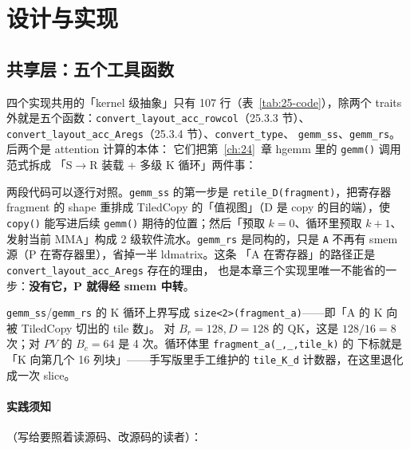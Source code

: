 \section{设计与实现}

\subsection{共享层：五个工具函数}

四个实现共用的「kernel 级抽象」只有 107 行（表~\ref{tab:25-code}），除两个
traits 外就是五个函数：\texttt{convert\_\allowbreak{}layout\_\allowbreak{}acc\_\allowbreak{}rowcol}（25.3.3 节）、
\texttt{convert\_\allowbreak{}layout\_\allowbreak{}acc\_\allowbreak{}Aregs}（25.3.4 节）、\texttt{convert\_\allowbreak{}type}、
\texttt{gemm\_ss}、\texttt{gemm\_rs}。后两个是 attention 计算的本体：
它们把第~\ref{ch:24}~章 hgemm 里的 \texttt{gemm()} 调用范式拆成
「S$\to$R 装载 + 多级 K 循环」两件事：





两段代码可以逐行对照。\texttt{gemm\_ss} 的第一步是
\texttt{retile\_\allowbreak{}D\allowbreak{}(fragment)}，把寄存器 fragment 的 shape 重排成 TiledCopy
的「值视图」（D 是 copy 的目的端），使 \texttt{copy()} 能写进后续
\texttt{gemm()} 期待的位置；然后「预取 $k{=}0$、循环里预取 $k{+}1$、
发射当前 MMA」构成 2 级软件流水。\texttt{gemm\_rs} 是同构的，只是
\texttt{A} 不再有 smem 源（P 在寄存器里），省掉一半 ldmatrix。这条
「A 在寄存器」的路径正是 \texttt{convert\_\allowbreak{}layout\_\allowbreak{}acc\_\allowbreak{}Aregs} 存在的理由，
也是本章三个实现里唯一不能省的一步：\textbf{没有它，P 就得经 smem 中转}。

\begin{remark}
  \texttt{gemm\_ss}/\texttt{gemm\_rs} 的 K 循环上界写成
  \texttt{size\allowbreak{}<2>\allowbreak{}(fragment\_\allowbreak{}a)}——即「A 的 K 向被 TiledCopy 切出的 tile 数」。
  对 $B_r{=}128,D{=}128$ 的 QK，这是 $128/16 = 8$ 次；对 $PV$ 的
  $B_c{=}64$ 是 4 次。循环体里 \texttt{fragment\_\allowbreak{}a\allowbreak{}(\_\allowbreak{},\allowbreak{}\_\allowbreak{},\allowbreak{}tile\_\allowbreak{}k)} 的
  下标就是「K 向第几个 16 列块」——手写版里手工维护的 \texttt{tile\_K\_d}
  计数器，在这里退化成一次 slice。
\end{remark}

\paragraph{实践须知}（写给要照着读源码、改源码的读者）：

